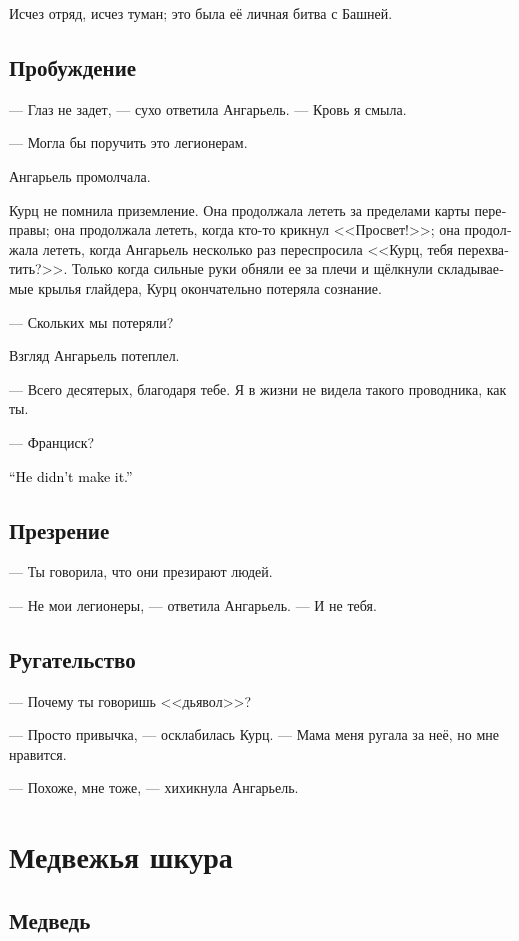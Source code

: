\documentclass[a4paper,12pt,fleqn]{book}\usepackage{cooltooltips}\usepackage{polyglossia}\setdefaultlanguage[babelshorthands=true]{russian}\setotherlanguage{english}\defaultfontfeatures{Ligatures=TeX,Mapping=tex-text} \usepackage{xcolor}\definecolor{lightgray}{HTML}{bbbbbb}\color{lightgray}\newcommand{\ml}[3]{\textenglish{\textcolor{black}{#3}}}
\begin{document}
Исчез отряд, исчез туман;
это была её личная битва с Башней.

\section{Пробуждение}

--- Глаз не задет, --- сухо ответила Ангарьель.
--- Кровь я смыла.

--- Могла бы поручить это легионерам.

Ангарьель промолчала.

Курц не помнила приземление.
Она продолжала лететь за пределами карты переправы;
она продолжала лететь, когда кто-то крикнул <<Просвет!>>;
она продолжала лететь, когда Ангарьель несколько раз переспросила <<Курц, тебя перехватить?>>.
Только когда сильные руки обняли ее за плечи и щёлкнули складываемые крылья глайдера, Курц окончательно потеряла сознание.

--- Скольких мы потеряли?

Взгляд Ангарьель потеплел.

--- Всего десятерых, благодаря тебе.
Я в жизни не видела такого проводника, как ты.

--- Франциск?

\ml{$0$}
{--- Он не выбрался.}
{``He didn't make it.''}

\section{Презрение}

--- Ты говорила, что они презирают людей.

--- Не мои легионеры, --- ответила Ангарьель.
--- И не тебя.

\section{Ругательство}

--- Почему ты говоришь <<дьявол>>?

--- Просто привычка, --- осклабилась Курц.
--- Мама меня ругала за неё, но мне нравится.

--- Похоже, мне тоже, --- хихикнула Ангарьель.

\chapter{Медвежья шкура}

\section{Медведь}
\end{document}
